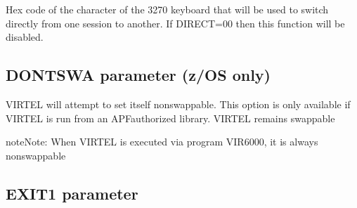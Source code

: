\documentclass[letterpaper,10pt,english]{sphinxmanual}
\begin{document}
\sphinxAtStartPar
{} \sphinxhyphen{} Hex code of the character of the 3270 keyboard that will be used to switch directly from one session to another. If DIRECT=00 then this function will be disabled.

\ignorespaces 

\subsection{DONTSWA parameter (z/OS only)}
\label{\detokenize{Installation_Guide:dontswa-parameter-z-os-only}}\label{\detokenize{Installation_Guide:index-54}}
\begin{sphinxVerbatim}[commandchars=\\\{\}]
 
\end{sphinxVerbatim}

\sphinxAtStartPar
{} \sphinxhyphen{} VIRTEL will attempt to set itself non\sphinxhyphen{}swappable. This option is only available if VIRTEL is run from an APF\sphinxhyphen{}authorized library.
 \sphinxhyphen{} VIRTEL remains swappable

\begin{sphinxadmonition}{note}{Note:}
\sphinxAtStartPar
When VIRTEL is executed via program VIR6000, it is always non\sphinxhyphen{}swappable
\end{sphinxadmonition}

\ignorespaces 

\subsection{EXIT1 parameter}
\label{\detokenize{Installation_Guide:exit1-parameter}}\label{\detokenize{Installation_Guide:index-55}}
\begin{sphinxVerbatim}[commandchars=\\\{\}]
 
\end{sphinxVerbatim}
\end{document}
